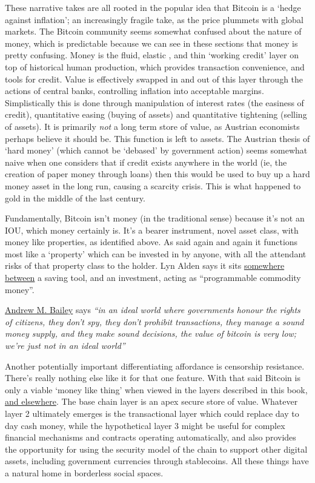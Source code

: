 These narrative takes are all rooted in the popular idea that Bitcoin is a `hedge against inflation'; an increasingly fragile take, as the price plummets with global markets. The Bitcoin community seems somewhat confused about the nature of money, which is predictable because we can see in these sections that money is pretty confusing. Money is the fluid, elastic \cite{cagan1958demand}, and thin `working credit' layer on top of historical human production, which provides transaction convenience, and tools for credit. Value is effectively swapped in and out of this layer through the actions of central banks, controlling inflation into acceptable margins. Simplistically this is done through manipulation of interest rates (the easiness of credit), quantitative easing (buying of assets) and quantitative tightening (selling of assets). It is primarily \textit{not} a long term store of value, as Austrian economists perhaps believe it should be. This function is left to assets. The Austrian thesis of `hard money' (which cannot be `debased' by government action) seems somewhat naive when one considers that if credit exists anywhere in the world (ie, the creation of paper money through loans) then this would be used to buy up a hard money asset in the long run, causing a scarcity crisis. This is what happened to gold in the middle of the last century. \par 
Fundamentally, Bitcoin isn't money (in the traditional sense) because it's not an IOU, which money certainly is. It's a bearer instrument, novel asset class, with money like properties, as identified above. As said again and again it functions most like a `property' which can be invested in by anyone, with all the attendant risks of that property class to the holder. Lyn Alden says it sits \href{https://www.lynalden.com/what-is-money/}{somewhere between} a saving tool, and an investment, acting as ``programmable commodity money''.\par 
\href{https://andrewmbailey.com/}{Andrew M. Bailey} says \textit{``in an ideal world where governments honour the rights of citizens, they don't spy, they don't prohibit transactions, they manage a sound money supply, and they make sound decisions, the value of bitcoin is very low; we're just not in an ideal world''}\par
Another potentially important differentiating affordance is censorship resistance. There's really nothing else like it for that one feature. With that said Bitcoin is only a viable `money like thing' when viewed in the layers described in this book, \href{https://giacomozucco.com/layers-before-bitcoin}{and elsewhere}\cite{Bhatia2021}. The base chain layer is an apex secure store of value. Whatever layer 2 ultimately emerges is the transactional layer which could replace day to day cash money, while the hypothetical layer 3 might be useful for complex financial mechanisms and contracts operating automatically, and also provides the opportunity for using the security model of the chain to support other digital assets, including government currencies through stablecoins. All these things have a natural home in borderless social spaces.
